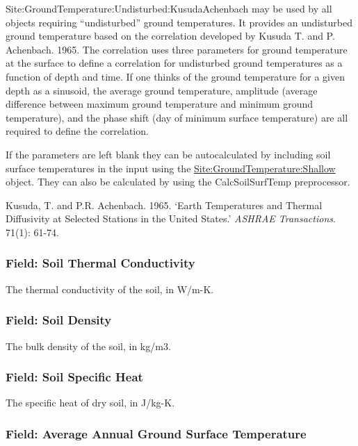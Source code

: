 Site:GroundTemperature:Undisturbed:KusudaAchenbach may be used by all objects requiring ``undisturbed'' ground temperatures. It provides an undisturbed ground temperature based on the correlation developed by Kusuda T. and P. Achenbach. 1965. The correlation uses three parameters for ground temperature at the surface to define a correlation for undisturbed ground temperatures as a function of depth and time. If one thinks of the ground temperature for a given depth as a sinusoid, the average ground temperature, amplitude (average difference between maximum ground temperature and minimum ground temperature), and the phase shift (day of minimum surface temperature) are all required to define the correlation.

If the parameters are left blank they can be autocalculated by including soil surface temperatures in the input using the \hyperref[sitegroundtemperatureshallow]{Site:GroundTemperature:Shallow} object. They can also be calculated by using the CalcSoilSurfTemp preprocessor.

Kusuda, T. and P.R. Achenbach. 1965. `Earth Temperatures and Thermal Diffusivity at Selected Stations in the United States.' \emph{ASHRAE Transactions}. 71(1): 61-74.

\subsubsection{Field: Soil Thermal Conductivity}\label{field-soil-thermal-conductivity-1}

The thermal conductivity of the soil, in W/m-K.

\subsubsection{Field: Soil Density}\label{field-soil-density-1}

The bulk density of the soil, in kg/m3.

\subsubsection{Field: Soil Specific Heat}\label{field-soil-specific-heat-1}

The specific heat of dry soil, in J/kg-K.

\subsubsection{Field: Average Annual Ground Surface Temperature}\label{field-average-annual-ground-surface-temperature}

